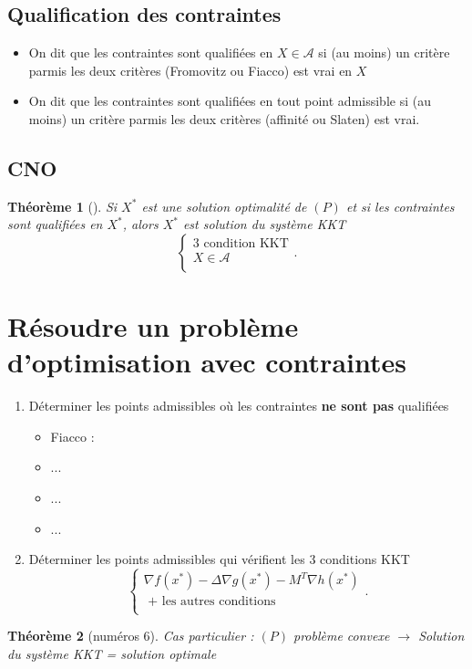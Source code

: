 \documentclass{article}
\theoremstyle{plain}%
\newtheorem{thm}{Théorème}[section]
\theoremstyle{definition}
\begin{document}
\subsection{Qualification des contraintes}
\begin{itemize}
    \item On dit que les contraintes sont qualifiées en $ X \in \mathcal{A} $ si (au moins) un critère parmis les deux critères (Fromovitz ou Fiacco) est vrai en $ X $ 
    \item On dit que les contraintes sont qualifiées en tout point admissible si (au moins) un critère parmis les deux critères (affinité ou Slaten) est vrai.
\end{itemize}

\subsection{CNO}
\begin{thm}[]
    Si $ X^* $ est une solution optimalité de $ (P) $  et si les contraintes sont qualifiées en $ X^* $, alors $ X^* $ est solution du système KKT 
    \[
        \begin{cases}
        3 \text{ condition KKT}\\
        X \in \mathcal{A}\\
        \end{cases} 
    .\]
\end{thm}

\section{Résoudre un problème d'optimisation avec contraintes}
\begin{enumerate}
    \item Déterminer les points admissibles où les contraintes \textbf{ne sont pas} qualifiées
    \begin{itemize}
        \item Fiacco : 
        \item ...
        \item ...
        \item ...
    \end{itemize}
    \item Déterminer les points admissibles qui vérifient les 3 conditions KKT
    \[
        \begin{cases}
        \nabla f(x^*) - \Delta \nabla g(x^*) - M^T \nabla h(x^*) \\
        \text{ + les autres conditions} \\
        \end{cases} 
    .\]
    
\end{enumerate}
\begin{thm}[numéros 6]
    Cas particulier : $ (P) $ problème convexe $\rightarrow$ Solution du système KKT = solution optimale
\end{thm}
\end{document}
